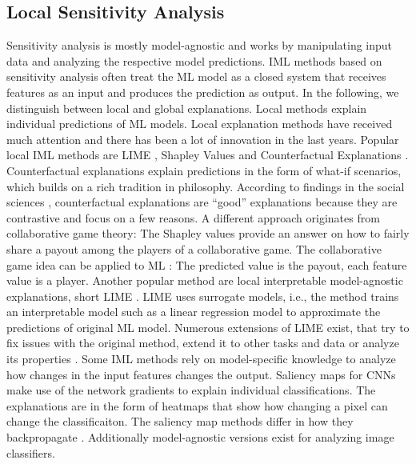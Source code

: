 \documentclass[runningheads]{llncs}
\begin{document}
\subsection{Local Sensitivity Analysis}

Sensitivity analysis is mostly model-agnostic and works by manipulating input data and analyzing the respective model predictions.
IML methods based on sensitivity analysis often treat the ML model as a closed system that receives features as an input and produces the prediction as output.
In the following, we distinguish between local and global explanations.
Local methods explain individual predictions of ML models.
Local explanation methods have received much attention and there has been a lot of innovation in the last years.
Popular local IML methods are LIME \cite{ribeiro2016should}, Shapley Values \cite{lundberg2017unified,vstrumbelj2014explaining} and Counterfactual Explanations \cite{wachter2017counterfactual,dandl2020multi}.
Counterfactual explanations explain predictions in the form of what-if scenarios, which builds on a rich tradition in philosophy.
According to findings in the social sciences \cite{miller2019explanation}, counterfactual explanations are \enquote{good} explanations because they are contrastive and focus on a few reasons.
A different approach originates from collaborative game theory:
The Shapley values \cite{shapley1953value} provide an answer on how to fairly share a payout among the players of a collaborative game.
The collaborative game idea can be applied to ML \cite{vstrumbelj2014explaining,lundberg2017unified,lundberg2018consistent}:
The predicted value is the payout, each feature value is a player.
Another popular method are local interpretable model-agnostic explanations, short LIME \cite{ribeiro2016should}.
LIME uses surrogate models, i.e., the method trains an interpretable model such as a linear regression model to approximate the predictions of original ML model.
Numerous extensions of LIME exist, that try to fix issues with the original method, extend it to other tasks and data or analyze its properties \cite{hu2018locally,rabold2018explaining,rabold2019enriching,visani2020optilime,haunschmid2020audiolime,rahnama2019study,shankaranarayana2019alime,botari2020melime}.
Some IML methods rely on model-specific knowledge to analyze how changes in the input features changes the output.
Saliency maps for CNNs make use of the network gradients to explain individual classifications.
The explanations are in the form of heatmaps that show how changing a pixel can change the classificaiton.
The saliency map methods differ in how they backpropagate \cite{sundararajan2017axiomatic,lundberg2017unified,montavon2017explaining,simonyan2013deep,shrikumar2016not}.
Additionally model-agnostic versions \cite{ribeiro2016should,lundberg2017unified,zeiler2014visualizing} exist for analyzing image classifiers.
\end{document}
